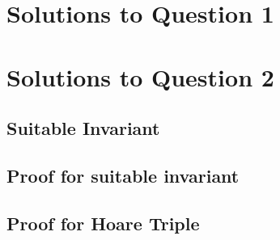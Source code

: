 \documentclass[a4paper,12pt]{article}
\numberwithin{equation}{subsection}
\begin{document}
\section{Solutions to Question 1}
% 

\section{Solutions to Question 2}
\subsection{Suitable Invariant}
\label{sec:2.1}

\subsection{Proof for suitable invariant}
\label{sec:2.2}

\subsection{Proof for Hoare Triple}
\label{sec:2.3}

\end{document}
